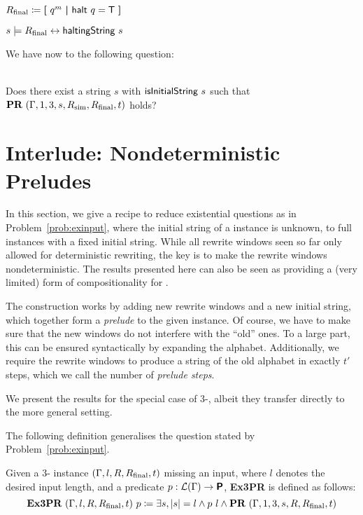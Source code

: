 \begin{definition}
  \mnote{$\Rfinal$}
  $R_{\text{final}} \coloneqq \textbf{[}~ q^m ~\textbf{|}~ \textsf{halt}~q = \mathsf{T} ~\textbf{]}$
\end{definition}

\begin{proposition}
  $s \models R_{\text{final}} \leftrightarrow \textsf{haltingString}~s$
\end{proposition}

We have now  \gennp{} to the following question: 
\begin{problem}\label{prob:exinput}~\\
  Does there exist a string $s$ with $\textsf{isInitialString}~s$ such that $\textbf{PR}{}~(\Gamma, 1, 3, s, R_{\text{sim}}, R_{\text{final}}, t)$ holds?
\end{problem}

\section{Interlude: Nondeterministic Preludes}\label{sec:preludes}
In this section, we give a recipe to reduce existential questions as in Problem~\ref{prob:exinput}, where the initial string of a \PR{} instance is unknown, to full \PR{} instances with a fixed initial string. 
While all rewrite windows seen so far only allowed for deterministic rewriting, the key is to make the rewrite windows nondeterministic. The results presented here can also be seen as providing a (very limited) form of compositionality for \PR{}.

The construction works by adding new rewrite windows and a new initial string, which together form a \emph{prelude} to the given \PR{} instance. 
Of course, we have to make sure that the new windows do not interfere with the ``old'' ones. To a large part, this can be ensured syntactically by expanding the alphabet. Additionally, we require the rewrite windows to produce a string of the old alphabet in exactly $t'$ steps, which we call the number of \emph{prelude steps}. 

We present the results for the special case of 3-\PR{}, albeit they transfer directly to the more general setting.

The following definition generalises the question stated by Problem~\ref{prob:exinput}.
\newcommand{\expr}{\textbf{Ex3PR}}
\begin{definition}[Existential 3-\PR{} (\expr{})][ExPTPR]
  \mnote[ExPTPR]{\expr{}}
  Given a 3-\PR{} instance $(\Gamma, l, R, R_{\text{final}}, t)$ missing an input, where $l$ denotes the desired input length, and a predicate $p : \mathcal{L} (\Gamma) \rightarrow \textsf{\bfseries P}$, \expr{} is defined as follows:
  \[\expr{}~(\Gamma, l, R, \Rfinal, t)~p \defeq \exists s, \length{s} = l \land p~l \land \PR{}~(\Gamma, 1, 3, s, R, \Rfinal, t) \]
\end{definition}

